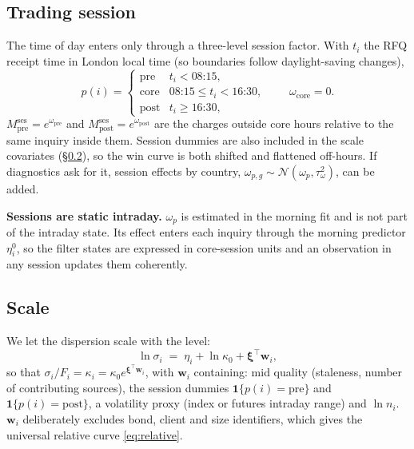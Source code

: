 \documentclass[11pt,a4paper]{article}
\theoremstyle{definition}
\theoremstyle{remark}
\newcommand{\T}{^{\top}}
\newcommand{\one}{\mathbf{1}}
\begin{document}
\subsection{Trading session}\label{sec:session}
The time of day enters only through a three-level session factor. With $t_i$ the RFQ receipt time in London local time (so boundaries follow daylight-saving changes),
\begin{equation}\label{eq:session}
p(i)=\begin{cases}
\mathrm{pre} & t_i<\text{08:15},\\
\mathrm{core} & \text{08:15}\le t_i<\text{16:30},\\
\mathrm{post} & t_i\ge\text{16:30},
\end{cases}
\qquad \omega_{\mathrm{core}}=0 .
\end{equation}
$M^{\mathrm{ses}}_{\mathrm{pre}}=e^{\omega_{\mathrm{pre}}}$ and $M^{\mathrm{ses}}_{\mathrm{post}}=e^{\omega_{\mathrm{post}}}$ are the charges outside core hours relative to the same inquiry inside them. Session dummies are also included in the scale covariates (\S\ref{sec:scale}), so the win curve is both shifted and flattened off-hours. If diagnostics ask for it, session effects by country, $\omega_{p,g}\sim\mathcal N(\omega_p,\tau_\omega^2)$, can be added.

\begin{decision}
\textbf{Sessions are static intraday.} $\omega_p$ is estimated in the morning fit and is not part of the intraday state. Its effect enters each inquiry through the morning predictor $\eta^0_i$, so the filter states are expressed in core-session units and an observation in any session updates them coherently.
\end{decision}

\subsection{Scale}\label{sec:scale}
We let the dispersion scale with the level:
\begin{equation}\label{eq:scale}
\ln\sigma_i \;=\; \eta_i + \ln\kappa_0 + \bm{\xi}\T\bm{w}_i,
\end{equation}
so that $\sigma_i/F_i=\kappa_i=\kappa_0e^{\bm\xi\T\bm w_i}$, with $\bm w_i$ containing: mid quality (staleness, number of contributing sources), the session dummies $\one\{p(i)=\mathrm{pre}\}$ and $\one\{p(i)=\mathrm{post}\}$, a volatility proxy (index or futures intraday range) and $\ln n_i$. $\bm w_i$ deliberately excludes bond, client and size identifiers, which gives the universal relative curve \eqref{eq:relative}.
\end{document}
